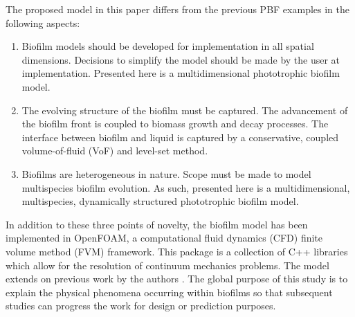 The proposed model in this paper differs from the previous PBF examples in the following aspects:
\begin{enumerate}
\item Biofilm models should be developed for implementation in all spatial dimensions. Decisions to simplify the model should be made by the user at implementation. Presented here is a multidimensional phototrophic biofilm model.
\item The evolving structure of the biofilm must be captured. The advancement of the biofilm front is coupled to biomass growth and decay processes. The interface between biofilm and liquid is captured by a conservative, coupled volume-of-fluid (VoF) and level-set method.
\item Biofilms are heterogeneous in nature. Scope must be made to model multispecies biofilm evolution. As such, presented here is a multidimensional,  multispecies, dynamically structured phototrophic biofilm model.
\end{enumerate}

In addition to these three points of novelty, the biofilm model has been implemented in OpenFOAM, a computational fluid dynamics (CFD) finite volume method (FVM) framework. This package is a collection of C++ libraries which allow for the resolution of continuum mechanics problems. The model extends on previous work by the authors \cite{Puyol2017}. The global purpose of this study is to explain the physical phenomena occurring within biofilms so that subsequent studies can progress the work for design or prediction purposes.
